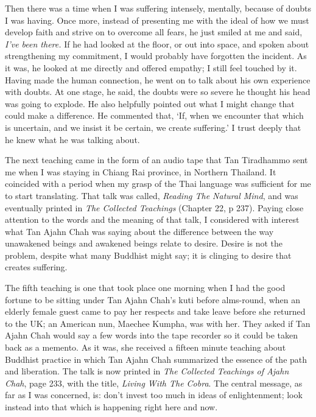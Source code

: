 Then there was a time when I was suffering intensely, mentally, because
of doubts I was having. Once more, instead of presenting me with the
ideal of how we must develop faith and strive on to overcome all fears,
he just smiled at me and said, \emph{I've been there.} If he had looked
at the floor, or out into space, and spoken about strengthening my
commitment, I would probably have forgotten the incident. As it was, he
looked at me directly and offered empathy; I still feel touched by it.
Having made the human connection, he went on to talk about his own
experience with doubts. At one stage, he said, the doubts were so severe
he thought his head was going to explode. He also helpfully pointed out
what I might change that could make a difference. He commented that,
`If, when we encounter that which is uncertain, and we insist it be
certain, we create suffering.' I trust deeply that he knew what he was
talking about.

The next teaching came in the form of an audio tape that Tan Tiradhammo
sent me when I was staying in Chiang Rai province, in Northern Thailand.
It coincided with a period when my grasp of the Thai language was
sufficient for me to start translating. That talk was called, \emph{Reading
The Natural Mind}, and was eventually printed in \emph{The Collected Teachings}\cite{collected}
(Chapter 22, p 237).
Paying close attention to the words and the meaning of that talk, I considered with
interest what Tan Ajahn Chah was saying about the difference between the
way unawakened beings and awakened beings relate to desire. Desire is
not the problem, despite what many Buddhist might say; it is clinging to
desire that creates suffering.

The fifth teaching is one that took place one morning when I had the
good fortune to be sitting under Tan Ajahn Chah's kuti before
alms-round, when an elderly female guest came to pay her respects and
take leave before she returned to the UK; an American nun, Maechee Kumpha,
was with her. They asked if Tan Ajahn Chah would say a few words into
the tape recorder so it could be taken back as a memento. As it was, she
received a fifteen minute teaching about Buddhist practice in which Tan
Ajahn Chah summarized the essence of the path and liberation. The talk
is now printed in \emph{The Collected Teachings of Ajahn Chah}\cite{collected},
page 233, with the title, \emph{Living With The Cobra}. The central message, as far as I
was concerned, is: don't invest too much in ideas of enlightenment; look
instead into that which is happening right here and now.

